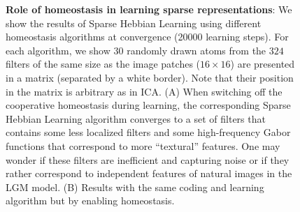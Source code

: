 \documentclass[a4paper, 11pt, draft]{article} %
\begin{document}
\begin{figure}%
\caption{
{\bf Role of homeostasis in learning sparse representations}: 
We show the results of Sparse Hebbian Learning using  different homeostasis algorithms at convergence (20000 learning steps). For each algorithm, we show $30$ randomly drawn atoms from the $324$ filters of the same size as the image patches ($16 \times 16$) are presented in a matrix (separated by a white border). Note that their position in the matrix is arbitrary as in ICA. {\sf (A)} When switching off the cooperative homeostasis during learning, the corresponding Sparse Hebbian Learning algorithm converges to a set of filters that contains some less localized filters and some high-frequency Gabor functions that correspond to more ``textural'' features. One may wonder if these filters are inefficient and capturing noise or if they rather correspond to independent features of natural images in the LGM model. {\sf (B)} Results with the same coding and learning algorithm but by enabling homeostasis. %
\label{fig:map}}%
\end{figure}%
\end{document}

